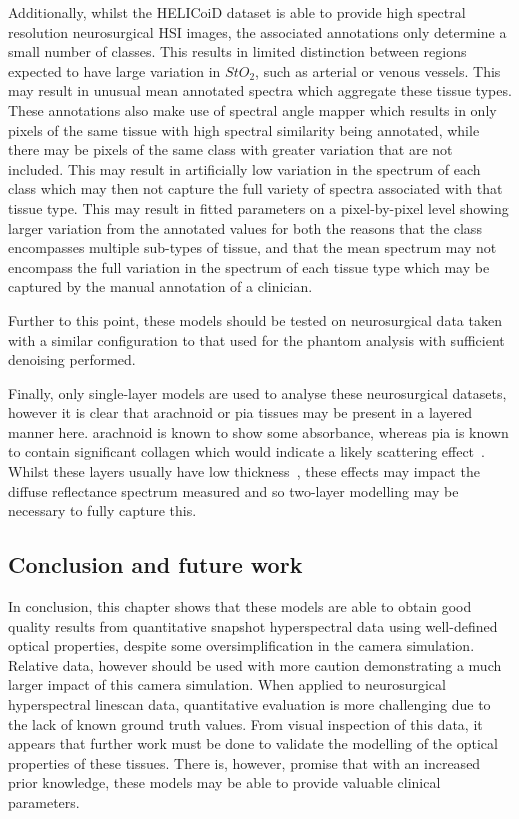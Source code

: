 Additionally, whilst the HELICoiD dataset is able to provide high spectral resolution neurosurgical HSI images, the associated annotations only determine a small number of classes. This results in limited distinction between regions expected to have large variation in $StO_2$, such as arterial or venous vessels. This may result in unusual mean annotated spectra which aggregate these tissue types. These annotations also make use of spectral angle mapper which results in only pixels of the same tissue with high spectral similarity being annotated, while there may be pixels of the same class with greater variation that are not included. This may result in artificially low variation in the spectrum of each class which may then not capture the full variety of spectra associated with that tissue type. This may result in fitted parameters on a pixel-by-pixel level showing larger variation from the annotated values for both the reasons that the class encompasses multiple sub-types of tissue, and that the mean spectrum may not encompass the full variation in the spectrum of each tissue type which may be captured by the manual annotation of a clinician. %

Further to this point, these models should be tested on neurosurgical data taken with a similar configuration to that used for the phantom analysis with sufficient denoising performed. 

Finally, only single-layer models are used to analyse these neurosurgical datasets, however it is clear that arachnoid or pia tissues may be present in a layered manner here. arachnoid is known to show some absorbance, whereas pia is known to contain significant collagen which would indicate a likely scattering effect~\citep{Ghannam2023}. Whilst these layers usually have low thickness~\citep{Ghannam2023}, these effects may impact the diffuse reflectance spectrum measured and so two-layer modelling may be necessary to fully capture this. 

\subsection{Conclusion and future work}
In conclusion, this chapter shows that these models are able to obtain good quality results from quantitative snapshot hyperspectral data using well-defined optical properties, despite some oversimplification in the camera simulation. Relative data, however should be used with more caution demonstrating a much larger impact of this camera simulation. When applied to neurosurgical hyperspectral linescan data, quantitative evaluation is more challenging due to the lack of known ground truth values. From visual inspection of this data, it appears that further work must be done to validate the modelling of the optical properties of these tissues. There is, however, promise that with an increased prior knowledge, these models may be able to provide valuable clinical parameters. 

